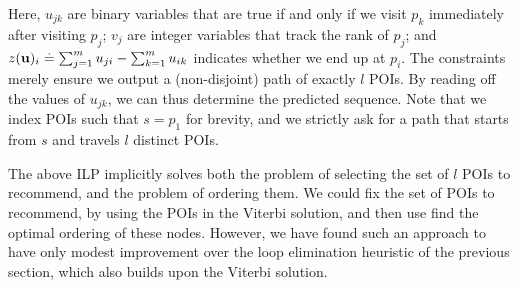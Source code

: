 
\vspace{0.5\baselineskip}

Here, $u_{jk}$ are binary variables that are true if and only if
we visit $p_k$ immediately after visiting $p_j$;
$v_j$ are integer variables that track the rank of $p_j$;
and $z(\mathbf{u})_i \stackrel{.}{=} \sum_{j=1}^m u_{ji} - \sum_{k=1}^m u_{ik}$ indicates whether we end up at $p_i$.
The constraints merely ensure we output a (non-disjoint) path of exactly $l$ POIs.
By reading off the values of $u_{jk}$, we can thus determine the predicted sequence.
Note that we index POIs such that $s = p_1$ for brevity,
and we strictly ask for a path that starts from $s$ and travels $l$ distinct POIs.

The above ILP implicitly solves both the problem of selecting the set of $l$ POIs to recommend,
and the problem of ordering them.
We could fix the set of POIs to recommend, \eg by using the POIs in the Viterbi solution, and then use find the optimal ordering of these nodes.
However, we have found such an approach to have only modest improvement over the loop elimination heuristic of the previous section, which also builds upon the Viterbi solution.
